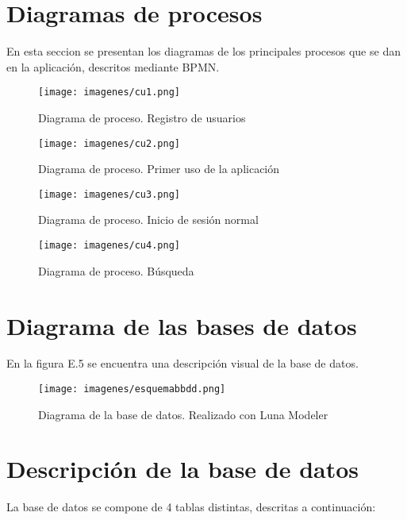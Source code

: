 \documentclass[a4paper,12pt,twoside]{memoir}
\begin{document}
\section{Diagramas de procesos}
En esta seccion se presentan los diagramas de los principales procesos que se dan en la aplicación, descritos mediante BPMN.
\begin{figure}
    \centering
    \texttt{[image: imagenes/cu1.png]}
    \caption{Diagrama de proceso. Registro de usuarios}
    \label{fig:enter-label}
\end{figure}
\begin{figure}
    \centering
    \texttt{[image: imagenes/cu2.png]}
    \caption{Diagrama de proceso. Primer uso de la aplicación}
    \label{fig:enter-label}
\end{figure}
\begin{figure}
    \centering
    \texttt{[image: imagenes/cu3.png]}
    \caption{Diagrama de proceso. Inicio de sesión normal}
    \label{fig:enter-label}
\end{figure}
\begin{figure}
    \centering
    \texttt{[image: imagenes/cu4.png]}
    \caption{Diagrama de proceso. Búsqueda}
    \label{fig:enter-label}
\end{figure}

\section{Diagrama de las bases de datos}
En la figura E.5 se encuentra una descripción visual de la base de datos.
 \begin{figure}
    \centering
    \texttt{[image: imagenes/esquemabbdd.png]}
    \caption{Diagrama de la base de datos. Realizado con Luna Modeler}
    \label{fig:enter-label}
\end{figure}

\section{Descripción de la base de datos}
La base de datos se compone de 4 tablas distintas, descritas a continuación:
\end{document}
